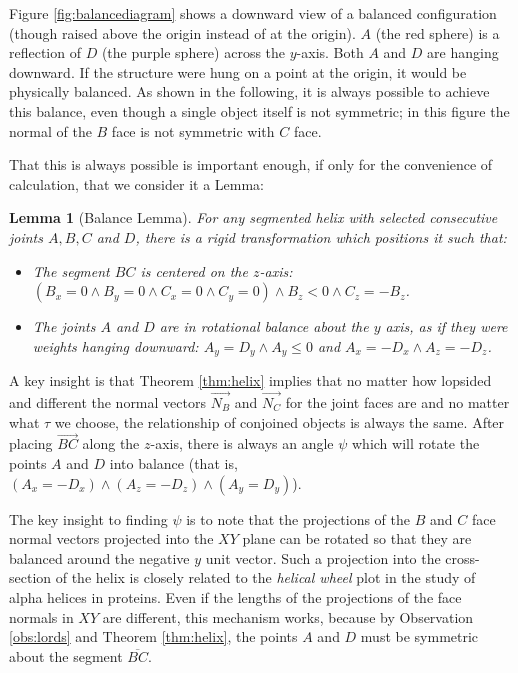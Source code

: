 \documentclass[11pt]{article}
\newtheorem{lemma}{Lemma}
\newenvironment{sketch}{%
  \renewcommand{\proofname}{Proof Sketch}\proof}{\endproof}
\begin{document}
{Figure \ref{fig:balancediagram} shows a downward view of a
balanced configuration (though raised above the origin
instead of at the origin).
$A$ (the red sphere) is a reflection of $D$ (the purple sphere) across
the $y$-axis.
Both $A$ and $D$ are hanging downward.
If the structure were hung on a point at the origin, it would
be physically balanced.
As shown in the following, it is always possible to achieve this balance,
even though a single object
itself is not symmetric; in this figure the normal of the $B$ face is not symmetric with $C$ face.

That this is always possible is important enough, if only for
the convenience of calculation, that we consider it a Lemma:
\begin{lemma}[Balance Lemma]
  For any segmented helix with selected consecutive joints $A,B,C$ and $D$,
  there is a rigid transformation which positions it such that:
  \begin{itemize}
  \item The segment $BC$ is centered on the $z$-axis:
    $(B_x = 0 \wedge B_y = 0 \wedge C_x = 0 \wedge C_y = 0)
    \wedge B_z < 0 \wedge C_z = -B_z$.
  \item The joints $A$ and $D$ are in rotational balance about
    the $y$ axis, as if they were weights hanging downward:
    $A_y = D_y \wedge A_y \leq 0 $ and
    $A_x = -D_x \wedge A_z = -D_z$.
  \end{itemize}
  \label{lem:balance}
\end{lemma}


\begin{sketch}

A key insight is that Theorem \ref{thm:helix} implies that no matter
how lopsided and different
the normal vectors  $\overrightarrow{N_B}$ and $\overrightarrow{N_C}$
for the joint faces are and no matter what $\tau$ we choose,
the relationship of conjoined objects
is always the same.
After placing $\overrightarrow{BC}$ along
the $z$-axis, there is always an angle $\psi$ which will
rotate the points $A$ and $D$ into balance (that is, $(A_x = -D_x) \wedge (A_z = -D_z) \wedge (A_y = D_y)$).

The key insight to finding $\psi$ is to note that
the projections of the $B$ and $C$ face normal vectors
projected into the $XY$ plane can be rotated so that they
are balanced around the negative $y$ unit vector.
Such a projection into the cross-section of the helix is closely related to
the {\em helical wheel}\cite{wiki:helicalwheel} plot
in the study of alpha helices in proteins.
Even if the lengths of the projections of the face normals in $XY$
are different, this mechanism works, because by Observation \ref{obs:lords} and Theorem \ref{thm:helix},
the points $A$ and $D$ must be symmetric about the segment $\overline{BC}$.


\end{sketch}}
\end{document}
